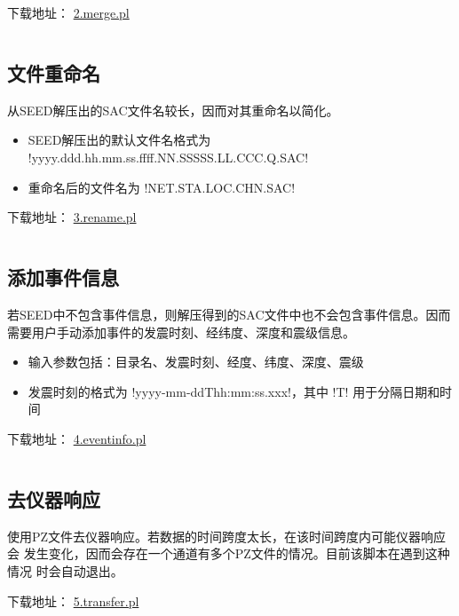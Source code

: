 下载地址： \href{https://raw.githubusercontent.com/seisman/SAC_Docs_zh/master/call-in-script/2.merge.pl}{2.merge.pl}
\inputminted{perl}{./call-in-script/2.merge.pl}

\subsection{文件重命名}
\label{subsec:rename-in-perl}
从SEED解压出的SAC文件名较长，因而对其重命名以简化。
\begin{itemize}
\item SEED解压出的默认文件名格式为 !yyyy.ddd.hh.mm.ss.ffff.NN.SSSSS.LL.CCC.Q.SAC!
\item 重命名后的文件名为 !NET.STA.LOC.CHN.SAC!
\end{itemize}

下载地址： \href{https://raw.githubusercontent.com/seisman/SAC_Docs_zh/master/call-in-script/3.rename.pl}{3.rename.pl}
\inputminted{perl}{./call-in-script/3.rename.pl}

\subsection{添加事件信息}
\label{subsec:event-info-perl}
若SEED中不包含事件信息，则解压得到的SAC文件中也不会包含事件信息。因而
需要用户手动添加事件的发震时刻、经纬度、深度和震级信息。
\begin{itemize}
\item 输入参数包括：目录名、发震时刻、经度、纬度、深度、震级
\item 发震时刻的格式为 !yyyy-mm-ddThh:mm:ss.xxx!，其中 !T!
    用于分隔日期和时间
\end{itemize}

下载地址： \href{https://raw.githubusercontent.com/seisman/SAC_Docs_zh/master/call-in-script/4.eventinfo.pl}{4.eventinfo.pl}
\inputminted{perl}{./call-in-script/4.eventinfo.pl}

\subsection{去仪器响应}
\label{subsec:transfer-perl}
使用PZ文件去仪器响应。若数据的时间跨度太长，在该时间跨度内可能仪器响应会
发生变化，因而会存在一个通道有多个PZ文件的情况。目前该脚本在遇到这种情况
时会自动退出。

下载地址： \href{https://raw.githubusercontent.com/seisman/SAC_Docs_zh/master/call-in-script/5.transfer.pl}{5.transfer.pl}
\inputminted{perl}{./call-in-script/5.transfer.pl}

